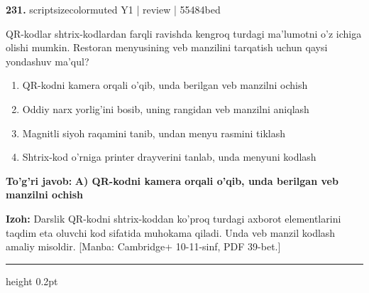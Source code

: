 \documentclass[10pt,a4paper]{article}
\begin{document}
{\bfseries\sffamily\color{ink} 231.} {scriptsizecolor{muted} Y1 | review | 55484bed}
\par
QR-kodlar shtrix-kodlardan farqli ravishda kengroq turdagi ma'lumotni o'z ichiga olishi mumkin. Restoran menyusining veb manzilini tarqatish uchun qaysi yondashuv ma'qul?
\begin{enumerate}[label=\Alph*),leftmargin=9mm]
\item QR-kodni kamera orqali o'qib, unda berilgan veb manzilni ochish
\item Oddiy narx yorlig'ini bosib, uning rangidan veb manzilni aniqlash
\item Magnitli siyoh raqamini tanib, undan menyu rasmini tiklash
\item Shtrix-kod o'rniga printer drayverini tanlab, unda menyuni kodlash
\end{enumerate}
\begin{tcolorbox}[enhanced,breakable,colback=teal!4,colframe=teal!60!black,boxrule=0.45pt,arc=1.2mm,left=2.7mm,right=2.7mm,top=1.8mm,bottom=1.8mm,before skip=2mm,after skip=2mm]
{\bfseries\sffamily\color{teal}To'g'ri javob:} \textbf{A) QR-kodni kamera orqali o'qib, unda berilgan veb manzilni ochish}
\par\smallskip
{\bfseries Izoh:} Darslik QR-kodni shtrix-koddan ko'proq turdagi axborot elementlarini taqdim eta oluvchi kod sifatida muhokama qiladi. Unda veb manzil kodlash amaliy misoldir. [Manba: Cambridge+ 10-11-sinf, PDF 39-bet.]
\end{tcolorbox}
\vspace{2mm}\hrule height 0.2pt\vspace{3mm}
\end{document}
